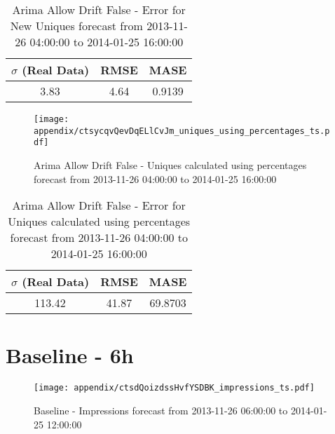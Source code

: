 \begin{table}[H]
\centering
\footnotesize
\begin{tabular}{ccc}
$\sigma$ (Real Data) & RMSE & MASE   \\ \hline
3.83 & 4.64 & 0.9139 \\
\end{tabular}

\vspace{0.5cm}

\caption{
Arima Allow Drift False - Error for New Uniques forecast from 2013-11-26 04:00:00 to 2014-01-25 16:00:00}
\end{table}

\begin{figure}[H] \begin{center} \leavevmode
\texttt{[image: appendix/ctsycqvQevDqELlCvJm\_uniques\_using\_percentages\_ts.pdf]} \caption{
Arima Allow Drift False - Uniques calculated using percentages forecast from 2013-11-26 04:00:00 to 2014-01-25 16:00:00} \label{fig:appendix/ctsycqvQevDqELlCvJm_uniques_using_percentages_ts.pdf} \end{center}
\end{figure}

\begin{table}[H]
\centering
\footnotesize
\begin{tabular}{ccc}
$\sigma$ (Real Data) & RMSE & MASE   \\ \hline
113.42 & 41.87 & 69.8703 \\
\end{tabular}

\vspace{0.5cm}

\caption{
Arima Allow Drift False - Error for Uniques calculated using percentages forecast from 2013-11-26 04:00:00 to 2014-01-25 16:00:00}
\end{table}

\section{Baseline - 6h}
\begin{figure}[H] \begin{center} \leavevmode
\texttt{[image: appendix/ctsdQoizdssHvfYSDBK\_impressions\_ts.pdf]} \caption{
Baseline - Impressions forecast from 2013-11-26 06:00:00 to 2014-01-25 12:00:00} \label{fig:appendix/ctsdQoizdssHvfYSDBK_impressions_ts.pdf} \end{center}
\end{figure}

